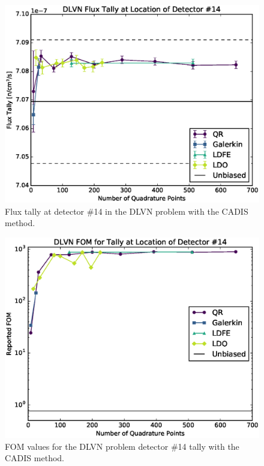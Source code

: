 \documentclass{article} %
\begin{document}
\begin{figure}[!htb]
\centering
\includegraphics[max height=0.445\textheight]{img/dlvn-cadis-tally.eps}
\caption{Flux tally at detector \#14 in the DLVN problem with the CADIS method.}
\label{dlvn-cad-tally}
\end{figure}

\begin{figure}[!htb]
\centering
\includegraphics[max height=0.445\textheight]{img/dlvn-cadis-fom.eps}
\caption{FOM values for the DLVN problem detector \#14 tally with the CADIS 
         method.}
\label{dlvn-cad-fom}
\end{figure}
\end{document}

